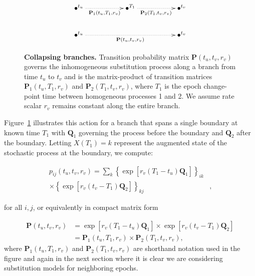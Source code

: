 \begin{figure}[h!]
\centering
\begingroup
\everymath{\displaystyle}
{\Large
\begin{displaymath} %
    \xymatrix{ 
    \bullet^{t_u} \ar@{.>}[rr]_{\mathbf{P}_{1}(t_{u},T_{1},r_v)} && \bullet^{T_1} \ar@{.>}[rr]_{\mathbf{P}_{2}(T_{1},t_{v},r_v)} && \bullet^{t_v} \\
    \bullet^{t_u} \ar@{.>}[rrrr]_{\mathbf{P}(t_{u},t_{v},r_v)} & & & & \bullet^{t_v}
    } %
\end{displaymath}
}
\endgroup
\caption{
{ \footnotesize 
{\bf Collapsing branches.} Transition probability matrix $\mathbf{P}(t_u,t_v,r_v)$ governs the inhomogeneous substitution process along a branch from time $t_u$ to $t_v$ and is the matrix-product of transition matrices $\mathbf{P}_{1}(t_u,T_1,r_v)$ and $\mathbf{P}_{2}(T_1,t_v,r_v)$, where $T_1$ is the epoch change-point time between homogeneous processes 1 and 2.  We assume rate scalar $r_v$ remains constant along the entire branch.
} %
}
\label{fig:collapsing}
\end{figure}

Figure~\ref{fig:collapsing} illustrates this action for a branch that spans a single boundary at known time $T_1$ with $\mathbf{Q}_1$ governing the process before the boundary and $\mathbf{Q}_2$ after the boundary. Letting $X(T_1) = k$ represent the augmented state of the stochastic process at the boundary, we compute:

\begin{align}
p_{ij}(t_u, t_v, r_v)
= \sum_{k} 
\left\{
\exp[ r_v ( T_1 - t_u ) \mathbf{Q}_1]
\right\}_{ik} & \nonumber \\
\times 
\left\{
\exp[ r_v ( t_v - T_1 ) \mathbf{Q}_2]
\right\}_{kj} & , 
\end{align}

\noindent
for all $i,j$, or equivalently in compact matrix form

\begin{align}
\mathbf{P}(t_u, t_v, r_v)
&= 
\exp[ r_v ( T_1 - t_u ) \mathbf{Q}_1]
\times
\exp[ r_v ( t_v - T_1 ) \mathbf{Q}_2] \nonumber \\
&= \mathbf{P}_{1}(t_u, T_1, r_v) \times \mathbf{P}_{2}(T_1, t_v, r_v) ,
\label{matrixProduct}
\end{align}
where 
$\mathbf{P}_{1}(t_u, T_1, r_v)$ and $\mathbf{P}_{2}(T_1, t_v, r_v)$ are shorthand notation used in the figure and again in the next section where it is clear we are considering substitution models for neighboring epochs.

